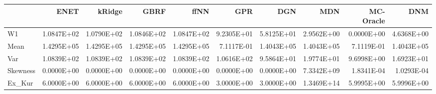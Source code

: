 \begin{tabular}{lrrrrrrrrr}
\toprule
{} &       ENET &     kRidge &       GBRF &       ffNN &        GPR &        DGN &        MDN &  MC-Oracle &        DNM \\
\midrule
W1       & 1.0847E+02 & 1.0790E+02 & 1.0846E+02 & 1.0847E+02 & 9.2305E+01 & 5.8125E+01 & 2.9562E+00 & 0.0000E+00 & 4.6368E+00 \\
Mean     & 1.4295E+05 & 1.4295E+05 & 1.4295E+05 & 1.4295E+05 & 7.1117E-01 & 1.4043E+05 & 1.4043E+05 & 7.1119E-01 & 1.4043E+05 \\
Var      & 1.0839E+02 & 1.0839E+02 & 1.0839E+02 & 1.0839E+02 & 1.0616E+02 & 9.5864E+01 & 1.9774E+01 & 9.6998E+00 & 1.6923E+01 \\
Skewness & 0.0000E+00 & 0.0000E+00 & 0.0000E+00 & 0.0000E+00 & 0.0000E+00 & 0.0000E+00 & 7.3342E+09 & 1.8341E-04 & 1.0293E-04 \\
Ex\_Kur   & 6.0000E+00 & 6.0000E+00 & 6.0000E+00 & 6.0000E+00 & 3.0000E+00 & 3.0000E+00 & 1.3469E+14 & 5.9995E+00 & 5.9996E+00 \\
\bottomrule
\end{tabular}
